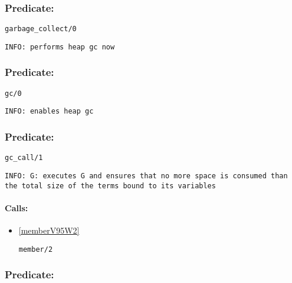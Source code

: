\subsubsection{Predicate:} \label{garbageV95WcollectV95W0}

\begin{verbatim}
garbage_collect/0
\end{verbatim}

{\small \begin{verbatim}
INFO: performs heap gc now

\end{verbatim}}

\subsubsection{Predicate:} \label{gcV95W0}

\begin{verbatim}
gc/0
\end{verbatim}

{\small \begin{verbatim}
INFO: enables heap gc

\end{verbatim}}

\subsubsection{Predicate:} \label{gcV95WcallV95W1}

\begin{verbatim}
gc_call/1
\end{verbatim}

{\small \begin{verbatim}
INFO: G: executes G and ensures that no more space is consumed than the total size of the terms bound to its variables

\end{verbatim}}
\paragraph{Calls:} 
\begin{itemize}
\item \ref{memberV95W2} 
\begin{verbatim}
member/2
\end{verbatim}

\end{itemize}

\subsubsection{Predicate:} \label{gcV95WstatusV95W1}

